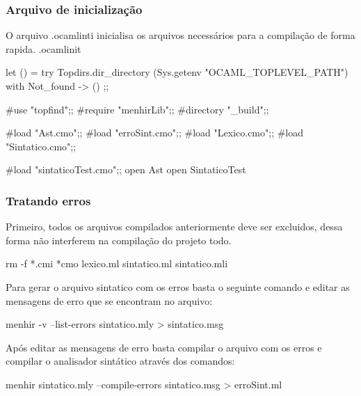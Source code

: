 \documentclass[12pt,a4paper,twoside]{article}
\begin{document}
\subsubsection{Arquivo de inicialização}
O arquivo .ocamlinti inicialisa os arquivos necessários para a compilação de forma rapida.
\newline
.ocamlinit
\begin{terminal}
let () =
    try Topdirs.dir_directory (Sys.getenv "OCAML_TOPLEVEL_PATH")
    with Not_found -> ()
;;

#use "topfind";;
#require "menhirLib";;
#directory "_build";;

#load "Ast.cmo";;
#load "erroSint.cmo";;
#load "Lexico.cmo";;
#load "Sintatico.cmo";;

#load "sintaticoTest.cmo";;
open Ast
open SintaticoTest
\end{terminal}

\subsubsection{Tratando erros}
Primeiro, todos os arquivos compilados anteriormente deve ser excluidos, dessa forma não interferem na compilação do projeto todo.
\begin{terminal}
rm -f *.cmi *cmo lexico.ml sintatico.ml sintatico.mli
\end{terminal}
Para gerar o arquivo sintatico com os erros basta o seguinte comando e editar as mensagens de erro que se encontram no arquivo:
\begin{terminal}
menhir -v --list-errors sintatico.mly > sintatico.msg
\end{terminal}
Após editar as mensagens de erro basta compilar o arquivo com os erros e compilar o analisador sintático através dos comandos:
\begin{terminal}
menhir sintatico.mly --compile-errors sintatico.msg > erroSint.ml
\end{terminal}
\end{document}
